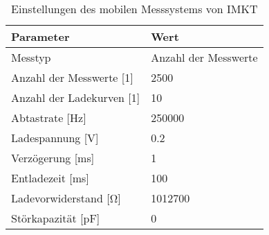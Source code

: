 \begin{table}[htbp]
    \centering
    \caption{Einstellungen des mobilen Messsystems von IMKT}
    \begin{tabular}{ll}
        \textbf{Parameter}               & \textbf{Wert}        \\
        \hline
        Messtyp                          & Anzahl der Messwerte \\
        Anzahl der Messwerte [\si{1}]    & 2500                 \\
        Anzahl der Ladekurven [\si{1}]   & 10                   \\
        Abtastrate [\si{\Hz}]            & 250000               \\
        Ladespannung [\si{\volt}]        & 0.2                  \\
        Verzögerung [\si{\ms}]           & 1                    \\
        Entladezeit [\si{\ms}]           & 100                  \\
        Ladevorwiderstand [\si{\ohm}]    & 1012700              \\
        Störkapazität [\si{\pico\farad}] & 0                    \\
    \end{tabular}
    \label{tab:einstellungen_des_ladekurve_messsystems}
\end{table}

